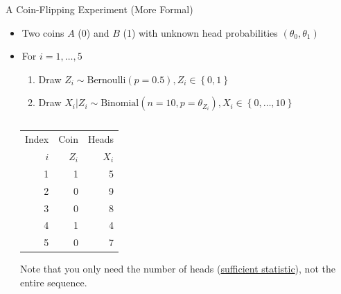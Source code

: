 \documentclass[dvipdfmx,bigger,aspectratio=169]{beamer}
\begin{document}
\begin{frame}[label={sec:org03b5ce2}]{A Coin-Flipping Experiment (More Formal)}
\begin{itemize}
\item Two coins \(A\) (0) and \(B\) (1) with unknown head probabilities \((\theta_{0},\theta_{1})\)
\item For \(i = 1, \dots, 5\)
\begin{enumerate}
\item Draw \(Z_{i} \sim \text{Bernoulli}(p = 0.5), Z_{i} \in \left\{ 0,1 \right\}\)
\item Draw \(X_{i} | Z_{i} \sim \text{Binomial}(n = 10, p = \theta_{Z_{i}}), X_{i} \in \left\{ 0, \dots, 10 \right\}\)
\end{enumerate}
\end{itemize}
\begin{columns}
\begin{column}{0.50\columnwidth}
\begin{center}
\end{center}
\end{column}

\begin{column}{0.50\columnwidth}
\begin{center}
\begin{tabular}{rrr}
Index & Coin & Heads\\
\(i\) & \(Z_{i}\) & \(X_{i}\)\\
\hline
1 & 1 & 5\\
2 & 0 & 9\\
3 & 0 & 8\\
4 & 1 & 4\\
5 & 0 & 7\\
\end{tabular}
\end{center}
\footnotesize Note that you only need the number of heads (\href{https://www.statisticshowto.datasciencecentral.com/sufficient-statistic/}{sufficient statistic}), not the entire sequence. \normalsize
\end{column}
\end{columns}
\end{frame}
\end{document}
